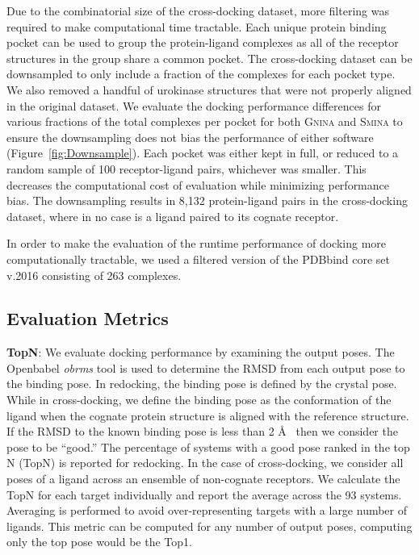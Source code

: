 \documentclass[journal=jcisd8,manuscript=article]{achemso}
\begin{document}
Due to the combinatorial size of the cross-docking dataset, more filtering was required to make computational time tractable. Each unique protein binding pocket can be used to group the protein-ligand complexes as all of the receptor structures in the group share a common pocket. The cross-docking dataset can be downsampled to only include a fraction of the complexes for each pocket type. We also removed a handful of urokinase structures that were not properly aligned in the original dataset. We evaluate the docking performance differences for various fractions of the total complexes per pocket for both \textsc{Gnina} and \textsc{Smina} to ensure the downsampling does not bias the performance of either software (Figure~\ref{fig:Downsample}). Each pocket was either kept in full, or reduced to a random sample of 100 receptor-ligand pairs, whichever was smaller. This decreases the computational cost of evaluation while minimizing performance bias. The downsampling results in 8,132 protein-ligand pairs in the cross-docking dataset, where in no case is a ligand paired to its cognate receptor.

In order to make the evaluation of the runtime performance of docking more computationally tractable, we used a filtered version of the PDBbind core set v.2016\cite{su2018comparative} consisting of 263 complexes.

\subsection{Evaluation Metrics}

\textbf{TopN}: We evaluate docking performance by examining the output poses. The Openbabel \textit{obrms} tool\cite{babelopen,o2011open} is used to determine the RMSD from each output pose to the binding pose. In redocking, the binding pose is defined by the crystal pose. While in cross-docking, we define the binding pose as the conformation of the ligand when the cognate protein structure is aligned with the reference structure. If the RMSD to the known binding pose is less than 2 \AA~ then we consider the pose to be ``good.'' The percentage of systems with a good pose ranked in the top N (TopN)  is reported for redocking. In the case of cross-docking, we consider all poses of a ligand across an ensemble of non-cognate receptors.  We calculate the TopN for each target individually and report the average across the 93 systems. Averaging is performed to avoid over-representing targets with a large number of ligands.
 This metric can be computed for any number of output poses, computing only the top pose would be the Top1.
\end{document}
